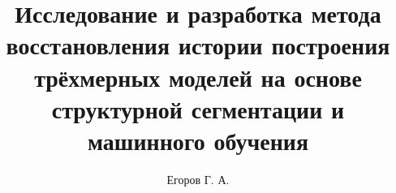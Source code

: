 \documentclass{mipt-thesis-ms}
\title{Исследование и разработка метода восстановления истории построения трёхмерных моделей на основе структурной сегментации и машинного обучения}
\author{Егоров Г. А.}
\begin{document}
\mainmatter
\pagestyle{miptthesis}
\titlepage \newpage
 \newpage
\makeatletter
\renewcommand{\tableofcontents}{%
  \chapternoindex{\contentsname}%
  \@mkboth{\contentsname}{\contentsname}%
}
\makeatother
\setcounter{tocdepth}{1}
\tableofcontents \newpage






\backmatter

\makeatletter
\let\original@section\section
\let\original@subsection\subsection

\renewcommand{\section}[1]{%
    \original@section*{#1}%
    \addcontentsline{toc}{section}{#1}%
}
\renewcommand{\subsection}[1]{%
    \original@subsection*{#1}%
    \addcontentsline{toc}{subsection}{#1}%
}
\makeatother
\printbib





\end{document}
